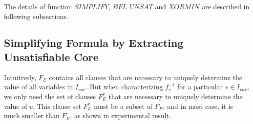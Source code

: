 \documentclass[journal]{IEEEtran}
\begin{document}
\vspace{0.2cm}

%
%
%
%
%

The details of function $SIMPLIFY$, $BFL\_UNSAT$ and $XORMIN$ are described in following subsections.

\subsection{Simplifying Formula by Extracting Unsatisfiable Core}\label{subsec_sim}
Intuitively,
$F_E$ contains all clauses that are necessary to uniquely determine the value of all variables in $I_{var}$.
But when characterizing $f_v^{-1}$ for a particular $v\in I_{var}$,
we only need the set of clauses $F_E^v$ that are necessary to uniquely determine the value of $v$.
This clause set $F_E^v$ must be a subset of $F_E$,
and in most case,
it is much smaller than $F_E$,
as shown in experimental result.
\end{document}
